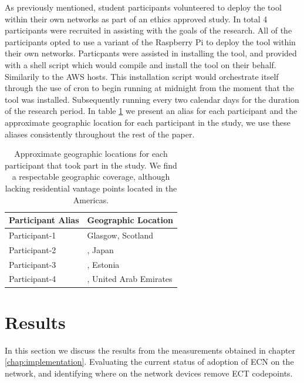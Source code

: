 \documentclass{l4proj}
\begin{document}
As previously mentioned, student participants volunteered to deploy the tool within their own networks as part of an ethics approved study. In total 4 participants were recruited in assisting with the goals of the research. All of the participants opted to use a variant of the Raspberry Pi to deploy the tool within their own networks. Particpants were assisted in installing the tool, and provided with a shell script which would compile and install the tool on their behalf. Similarily to the AWS hosts. This installation script would orchestrate itself through the use of cron to begin running at midnight from the moment that the tool was installed. Subsequently running every two calendar days for the duration of the research period. In table \ref{table:participants} we present an alias for each participant and the approximate geographic location for each participant in the study, we use these aliases consistently throughout the rest of the paper.


\begin{table}[H]
\centering
\begin{tabular}{|l|l|}
\hline
\textbf{Participant Alias} & \textbf{Geographic Location}    \\ \hline
Participant-1     & Glasgow, Scotland      \\ \hline
Participant-2     & , Japan                \\ \hline
Participant-3     & , Estonia              \\ \hline
Participant-4     & , United Arab Emirates \\ \hline
\end{tabular}
\label{table:participants}
\caption{Approximate geographic locations for each participant that took part in the study. We find a respectable geographic coverage, although lacking residential vantage points located in the Americas.}
\end{table}

\chapter{Results} 

In this section we discuss the results from the measurements obtained in chapter \ref{chap:implementation}. Evaluating the current status of adoption of ECN on the network, and identifying where on the network devices remove ECT codepoints.
\end{document}
